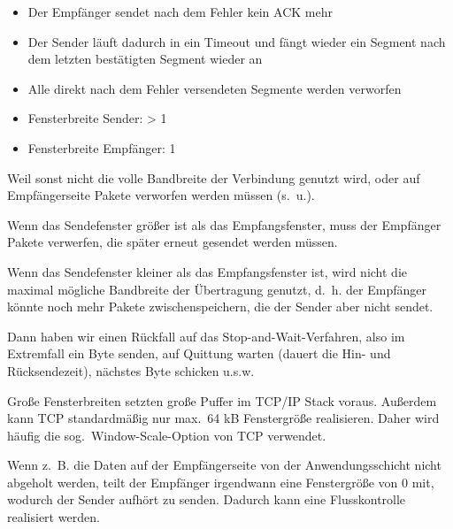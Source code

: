 \begin{itemize}
    \item Der Empfänger sendet nach dem Fehler kein ACK mehr
    \item Der Sender läuft dadurch in ein Timeout und fängt wieder ein Segment nach dem letzten bestätigten Segment wieder an
    \item Alle direkt nach dem Fehler versendeten Segmente werden verworfen
\end{itemize}

\begin{itemize}
    \item Fensterbreite Sender: > 1
    \item Fensterbreite Empfänger: 1
\end{itemize}

Weil sonst nicht die volle Bandbreite der Verbindung genutzt wird, oder auf Empfängerseite Pakete verworfen werden müssen (s.\ u.).

Wenn das Sendefenster größer ist als das Empfangsfenster, muss der Empfänger Pakete verwerfen, die später erneut gesendet werden müssen.

Wenn das Sendefenster kleiner als das Empfangsfenster ist, wird nicht die maximal mögliche Bandbreite der Übertragung genutzt,
d.\ h. der Empfänger könnte noch mehr Pakete zwischenspeichern, die der Sender aber nicht sendet.

Dann haben wir einen Rückfall auf das Stop-and-Wait-Verfahren, also im Extremfall ein Byte senden,
auf Quittung warten (dauert die Hin- und Rücksendezeit), nächstes Byte schicken u.s.w.

Große Fensterbreiten setzten große Puffer im TCP/IP Stack voraus.
Außerdem kann TCP standardmäßig nur max.\ 64 kB Fenstergröße realisieren.
Daher wird häufig die sog.\ Window-Scale-Option von TCP verwendet.

Wenn z.\ B. die Daten auf der Empfängerseite von der Anwendungsschicht nicht abgeholt werden, teilt der Empfänger irgendwann eine Fenstergröße von 0 mit, wodurch der Sender aufhört zu senden.
Dadurch kann eine Flusskontrolle realisiert werden.


